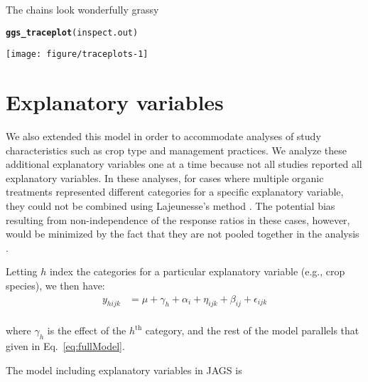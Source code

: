\documentclass{article}\usepackage[]{graphicx}\usepackage[]{color}
\makeatletter
\def\maxwidth{ %
  \ifdim\Gin@nat@width>\linewidth
    \linewidth
  \else
    \Gin@nat@width
  \fi
}
\newcommand{\hlstd}[1]{\textcolor[rgb]{0.345,0.345,0.345}{#1}}%
\newcommand{\hlkwd}[1]{\textcolor[rgb]{0.737,0.353,0.396}{\textbf{#1}}}%
\newenvironment{kframe}{%
 \def\at@end@of@kframe{}%
 \ifinner\ifhmode%
  \def\at@end@of@kframe{\end{minipage}}%
  \begin{minipage}{\columnwidth}%
 \fi\fi%
 \def\FrameCommand##1{\hskip\@totalleftmargin \hskip-\fboxsep
 \colorbox{shadecolor}{##1}\hskip-\fboxsep
     \hskip-\linewidth \hskip-\@totalleftmargin \hskip\columnwidth}%
 \MakeFramed {\advance\hsize-\width
   \@totalleftmargin\z@ \linewidth\hsize
   \@setminipage}}%
 {\par\unskip\endMakeFramed%
 \at@end@of@kframe}
\newenvironment{knitrout}{}{} %
\makeatother
\begin{document}
The chains look wonderfully grassy

\begin{knitrout}
\color{fgcolor}\begin{kframe}
\begin{alltt}
\hlkwd{ggs_traceplot}\hlstd{(inspect.out)}
\end{alltt}
\end{kframe}
\texttt{[image: figure/traceplots-1]} 

\end{knitrout}



\section{Explanatory variables}
\label{sec:variables}
We also extended this model in order to accommodate analyses of study
characteristics such as crop type and management practices. We analyze
these additional explanatory variables one at a time because not all
studies reported all explanatory variables. In these analyses, for
cases where multiple organic treatments represented different
categories for a specific explanatory variable, they could not be
combined using Lajeunesse's method \citep{Lajeunesse2011}. The
potential bias resulting from non-independence of the response ratios
in these cases, however, would be minimized by the fact that they are
not pooled together in the analysis \citep{Lajeunesse2011}.

Letting $h$ index the categories for a particular explanatory variable
(e.g., crop species), we then have:
%
\begin{equation}
  \begin{split}
    \label{eq:fullModel_cov}
    y_{hijk} &=
    \mu + \gamma_h + \alpha_i + \eta_{ijk} +  \beta_{ij} + \epsilon_{ijk}\\
  \end{split}
\end{equation}
%

where $\gamma_h$ is the effect of the $h^{\mathrm{th}}$ category, and
the rest of the model parallels that given in Eq.~\ref{eq:fullModel}.

The model including explanatory variables in JAGS is
\end{document}
